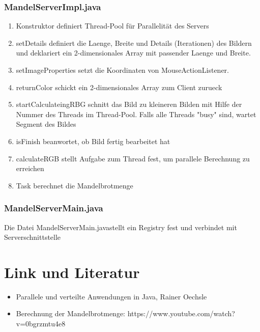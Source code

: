 \documentclass{article}
\begin{document}
	\subsubsection{MandelServerImpl.java}
	\begin{enumerate}
		\item Konstruktor definiert Thread-Pool für Parallelität des Servers
			
		\item setDetails definiert die Laenge, Breite und Details (Iterationen) des Bildern und deklariert ein 2-dimensionales Array mit passender Laenge und Breite.
			
		\item setImageProperties setzt die Koordinaten von MouseActionListener.
			
		\item returnColor schickt ein 2-dimensionales Array zum Client zurueck
			
		\newpage		
		\item startCalculateingRBG schnitt das Bild zu kleineren Bilden mit Hilfe der Nummer des Threads im Thread-Pool. Falls alle Threads "busy" sind, wartet Segment des Bildes 
			
		\item isFinish beanwortet, ob Bild fertig bearbeitet hat
			
		\item calculateRGB stellt Aufgabe zum Thread fest, um parallele Berechnung zu erreichen
			
		\newpage
		\item Task berechnet die Mandelbrotmenge
			
	\end{enumerate}
	
	\subsubsection{MandelServerMain.java}
	Die Datei \glqq MandelServerMain.java\grqq stellt ein Registry fest und verbindet mit Serverschnittstelle
	
	
	\newpage
	\section{Link und Literatur}
	\begin{itemize}
		\item Parallele und verteilte Anwendungen in Java, Rainer Oechsle
		\item Berechnung der Mandelbrotmenge: https://www.youtube.com/watch?v=0bgrzmtu4e8
	\end{itemize}
\end{document}
